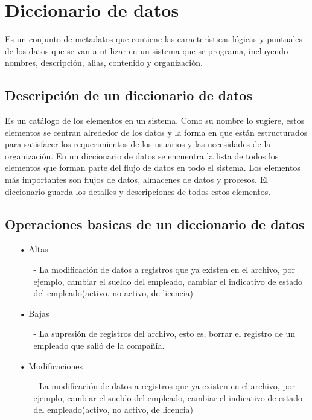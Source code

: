 \chapter[Diccionario de datos]{Diccionario de datos}
Es un conjunto de metadatos que contiene las características lógicas y puntuales de los datos que se van a utilizar en un sistema que se programa, incluyendo nombres, descripción, alias, contenido y organización.

\section{Descripción de un diccionario de datos}
Es un catálogo de los elementos en un sistema. Como su nombre lo sugiere, estos elementos se centran alrededor de los datos y la forma en que están estructurados para satisfacer los requerimientos de los usuarios y las necesidades de la organización. En un diccionario de datos se encuentra la lista de todos los elementos que forman parte del flujo de datos en todo el sistema. Los elementos más importantes son flujos de datos, almacenes de datos y procesos. El diccionario guarda los detalles y descripciones de todos estos elementos.

\section{Operaciones basicas de un diccionario de datos}
\begin{itemize}

\item[•] Altas
\begin{itemize}
\item[-] La modificación de datos a registros que ya existen en el archivo, por ejemplo, cambiar el sueldo del empleado, cambiar el indicativo de estado del empleado(activo, no activo, de licencia)
\end{itemize}
\item[•] Bajas
\begin{itemize}
\item[-] La supresión de registros del archivo, esto es, borrar el registro de un empleado que salió de la compañía.
\end{itemize}
\item[•] Modificaciones
\begin{itemize}
\item[-] La modificación de datos a registros que ya existen en el archivo, por ejemplo, cambiar el sueldo del empleado, cambiar el indicativo de estado del empleado(activo, no activo, de licencia)
\end{itemize}
\end{itemize}

